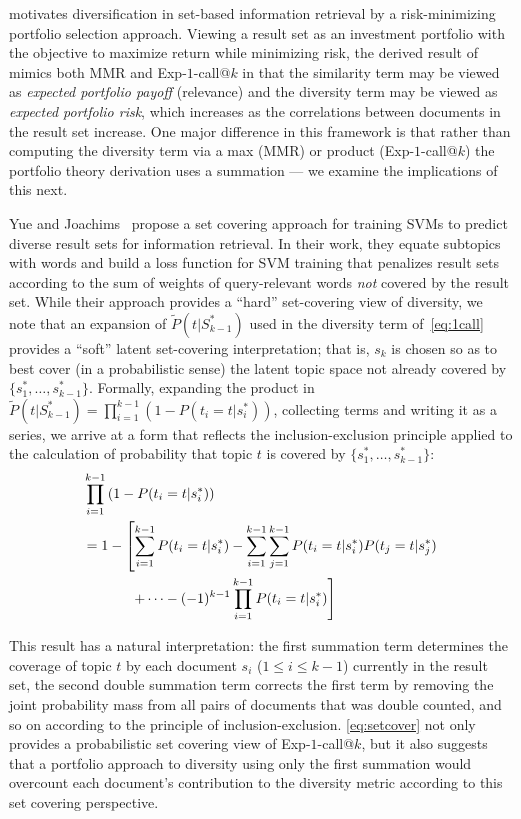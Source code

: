  \cite{wang09PortfolioTheory} motivates
diversification in set-based information retrieval by a
risk-minimizing portfolio selection approach.  Viewing a result set as
an investment portfolio with the objective to maximize return while
minimizing risk, the derived result of~\cite{wang09PortfolioTheory}
mimics both MMR and Exp-$1$-call@$k$ in that the similarity term may
be viewed as \emph{expected portfolio payoff} (relevance) and the
diversity term may be viewed as \emph{expected portfolio risk}, which
increases as the correlations between documents in the result set
increase.  One major difference in this framework is that rather than
computing the diversity term via a max (MMR) or product
(Exp-$1$-call@$k$) the portfolio theory derivation uses a summation
--- we examine the implications of this next.

Yue and Joachims~\cite{yue081224Predicting} propose a set covering
approach for training SVMs to predict diverse result sets for
information retrieval.  In their work, they equate subtopics with
words and build a loss function for SVM training that penalizes
result sets according to the sum of weights of query-relevant words
\emph{not} covered by the result set.  While their approach provides a
``hard'' set-covering view of diversity, we note that an expansion of
$\tilde{P}(t | S_{k-1}^*)$ used in the diversity term
of~\eqref{eq:1call} provides a ``soft'' latent set-covering
interpretation; that is, $s_k$ is chosen so as to best cover (in a
probabilistic sense) the latent topic space not already covered by $\{
s_1^*,\ldots,s_{k-1}^* \}$.  Formally, expanding the product in
$\tilde{P}(t | S_{k-1}^*) = \prod_{i=1}^{k-1} \left(1 -
P(t_{i}=t|s_{i}^{*})\right)$, collecting terms and writing it as a
series, we arrive at a form that reflects the inclusion-exclusion
principle applied to the calculation of probability that topic $t$ is
covered by $\{ s_1^*,\ldots,s_{k-1}^* \}$:
\begin{align}
& \prod_{i=1}^{k-1} \left(1 - P(t_{i}=t|s_{i}^{*})\right) \nonumber \\
& = 1 - \left[ \sum_{i=1}^{k-1} P(t_{i}= t|s_{i}^{*}) - \sum_{i=1}^{k-1}\sum_{j=1}^{k-1}P(t_{i}= t|s_{i}^{*})P(t_{j}= t|s_{j}^{*}) \right. \nonumber \\
& \hspace{12mm} \left. + \dots - (-1)^{k-1}\prod_{i=1}^{k-1}P(t_{i}=t|s_{i}^{*})\right] \label{eq:setcover}
\end{align}

This result has a natural interpretation: the first summation term
determines the coverage of topic $t$ by each document $s_i$ ($1 \leq i
\leq k-1$) currently in the result set, the second double summation
term corrects the first term by removing the joint probability mass
from all pairs of documents that was double counted, and so on
according to the principle of inclusion-exclusion.
\eqref{eq:setcover} not only provides a probabilistic set covering
view of Exp-$1$-call@$k$, but it also suggests that a portfolio
approach to diversity using only the first summation would overcount
each document's contribution to the diversity metric according to this
set covering perspective.

